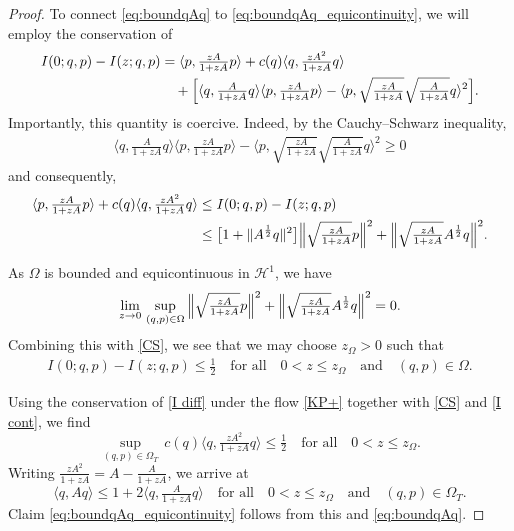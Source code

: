 \documentclass{amsart}
\newcommand{\qtq}[1]{\quad\text{#1}\quad}
\theoremstyle{definition}
\numberwithin{equation}{section}
\renewcommand{\H}{\mathcal H}
\newcommand{\la}{\langle}
\newcommand{\ra}{\rangle}
\begin{document}
\begin{proof}
To connect \eqref{eq:boundqAq} to \eqref{eq:boundqAq_equicontinuity}, we will employ the conservation of
\begin{equation}\label{I diff}
\begin{aligned}
I(0;q,p)-I(z;q,p) &= \langle p, \tfrac{zA}{1+zA}p\rangle + c(q) \langle q, \tfrac{zA^2}{1+zA}q\rangle \\
&\quad+  \Bigl[ \langle q, \tfrac{A}{1+zA}q\rangle\langle p, \tfrac{zA}{1+zA}p\rangle -\langle p, \sqrt{\tfrac{zA}{1+zA}}\sqrt{\tfrac{A}{1+zA}}q\rangle^2  \Bigr].
\end{aligned}
\end{equation}
Importantly, this quantity is coercive. Indeed, by the Cauchy--Schwarz inequality,
\begin{align*}
 \langle q, \tfrac{A}{1+zA}q\rangle\langle p, \tfrac{zA}{1+zA}p\rangle -\langle p, \sqrt{\tfrac{zA}{1+zA}}\sqrt{\tfrac{A}{1+zA}}q\rangle^2 \geq 0
\end{align*}
and consequently,
\begin{equation}\label{CS}
\begin{aligned}
\langle p, \tfrac{zA}{1+zA}p\rangle + c(q) \langle q, \tfrac{zA^2}{1+zA}q\rangle
&\leq I(0;q,p)-I(z;q,p)\\
&\leq \bigl[1+\|A^{\frac12}q\|^2\bigr]\Bigl\| \sqrt{\tfrac{zA}{1+zA}}p\Bigr\|^2+ \Bigl\|\sqrt{\tfrac{zA}{1+zA}}A^{\frac12}q\Bigr\|^2.
\end{aligned}
\end{equation}

As $\Omega$ is bounded and equicontinuous in $\H^1$, we have
\begin{align*}
\lim_{z\to 0}\, \sup_{(q,p)\in \Omega}\, \Bigl\| \sqrt{\tfrac{zA}{1+zA}}p\Bigr\|^2+ \Bigl\|\sqrt{\tfrac{zA}{1+zA}}A^{\frac12}q\Bigr\|^2=0.
\end{align*}
Combining this with \eqref{CS}, we see that we may choose $z_{\Omega}>0$ such that
\begin{align}\label{I cont}
I(0;q,p)-I(z;q,p) \leq \tfrac12 \qtq{for all} 0<z\leq z_\Omega \qtq{and} (q,p)\in \Omega.
\end{align}


Using the conservation of \eqref{I diff} under the flow \eqref{KP+} together with \eqref{CS} and \eqref{I cont}, we find
\begin{equation*}
\sup_{(q,p)\in \Omega_T}\, c(q) \langle q, \tfrac{zA^2}{1+zA}q\rangle \leq \tfrac12  \qtq{for all} 0<z\leq z_\Omega.
\end{equation*}
Writing $\frac{zA^2}{1+zA} = A- \tfrac{A}{1+zA}$, we arrive at
\begin{equation*}
\la q, Aq\ra \leq 1 + 2\la q, \tfrac{A}{1+zA}q\ra \qtq{for all} 0<z\leq z_\Omega \qtq{and} (q,p)\in \Omega_T.
\end{equation*}
Claim \eqref{eq:boundqAq_equicontinuity} follows from this and \eqref{eq:boundqAq}.


\end{proof}
\end{document}
